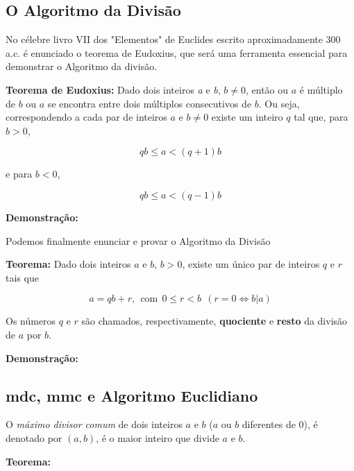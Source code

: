     \subsection{O Algoritmo da Divisão}

No célebre livro VII dos "Elementos" de Euclides escrito aproximadamente 300 a.c. é enunciado o teorema de Eudoxius, que será uma ferramenta essencial para demonstrar o Algoritmo da divisão.

\noindent \textbf{Teorema de Eudoxius:} Dado dois inteiros \textit{a} e \textit{b}, $b \neq 0$, então ou $a$ é múltiplo de $b$ ou $a$ se encontra entre dois múltiplos consecutivos de $b$. Ou seja, correspondendo a cada par de inteiros $a$ e $b \neq 0$ existe um inteiro $q$ tal que, para $b > 0$,

\begin{equation*}
	qb \leq a < (q+1)b
\end{equation*}

\noindent e para $b<0$,

\begin{equation*}
	qb \leq a < (q-1)b
\end{equation*}

\noindent \textbf{Demonstração:}      



Podemos finalmente enunciar e provar o Algoritmo da Divisão

\noindent \textbf{Teorema:} Dado dois inteiros $a$ e $b$, $b>0$, existe um único par de inteiros $q$ e $r$ tais que 

\begin{equation*}
	a = qb + r, \ \ \text{com} \ \ 0 \leq r < b \ \ (r = 0 \Leftrightarrow b|a)
\end{equation*}   

\noindent Os números $q$ e $r$ são chamados, respectivamente, \textbf{quociente} e \textbf{resto} da divisão de $a$ por $b$.

\noindent \textbf{Demonstração:}


		\subsection{mdc, mmc e Algoritmo Euclidiano}    
        
		
O \textit{máximo divisor comum} de dois inteiros $a$ e $b$ ($a$ ou $b$ diferentes de $0$), é denotado por $(a,b)$, é o maior inteiro que divide $a$ e $b$.

\noindent \textbf{Teorema:}

